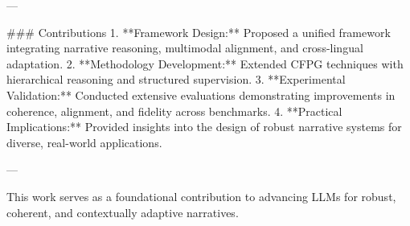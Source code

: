 ---

### Contributions
1. **Framework Design:** Proposed a unified framework integrating narrative reasoning, multimodal alignment, and cross-lingual adaptation.
2. **Methodology Development:** Extended CFPG techniques with hierarchical reasoning and structured supervision.
3. **Experimental Validation:** Conducted extensive evaluations demonstrating improvements in coherence, alignment, and fidelity across benchmarks.
4. **Practical Implications:** Provided insights into the design of robust narrative systems for diverse, real-world applications.

--- 

This work serves as a foundational contribution to advancing LLMs for robust, coherent, and contextually adaptive narratives.